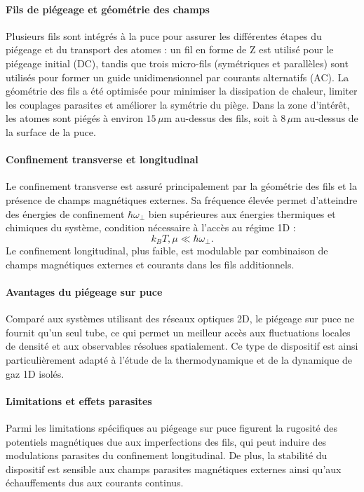 \paragraph{Fils de piégeage et géométrie des champs}
Plusieurs fils sont intégrés à la puce pour assurer les différentes étapes du piégeage et du transport des atomes : un fil en forme de Z est utilisé pour le piégeage initial (DC), tandis que trois micro-fils (symétriques et parallèles) sont utilisés pour former un guide unidimensionnel par courants alternatifs (AC). La géométrie des fils a été optimisée pour minimiser la dissipation de chaleur, limiter les couplages parasites et améliorer la symétrie du piège. Dans la zone d’intérêt, les atomes sont piégés à environ \(15\,\mu\mathrm{m}\) au-dessus des fils, soit à \(8\,\mu\mathrm{m}\) au-dessus de la surface de la puce.

\paragraph{Confinement transverse et longitudinal}
Le confinement transverse est assuré principalement par la géométrie des fils et la présence de champs magnétiques externes. Sa fréquence élevée permet d’atteindre des énergies de confinement \(\hbar \omega_\perp\) bien supérieures aux énergies thermiques et chimiques du système, condition nécessaire à l’accès au régime 1D :
\[
k_B T, \mu \ll \hbar \omega_\perp.
\]
Le confinement longitudinal, plus faible, est modulable par combinaison de champs magnétiques externes et courants dans les fils additionnels.

\paragraph{Avantages du piégeage sur puce}
Comparé aux systèmes utilisant des réseaux optiques 2D, le piégeage sur puce ne fournit qu’un seul tube, ce qui permet un meilleur accès aux fluctuations locales de densité et aux observables résolues spatialement. Ce type de dispositif est ainsi particulièrement adapté à l'étude de la thermodynamique et de la dynamique de gaz 1D isolés.

\paragraph{Limitations et effets parasites}
Parmi les limitations spécifiques au piégeage sur puce figurent la rugosité des potentiels magnétiques due aux imperfections des fils, qui peut induire des modulations parasites du confinement longitudinal. De plus, la stabilité du dispositif est sensible aux champs parasites magnétiques externes ainsi qu’aux échauffements dus aux courants continus.



